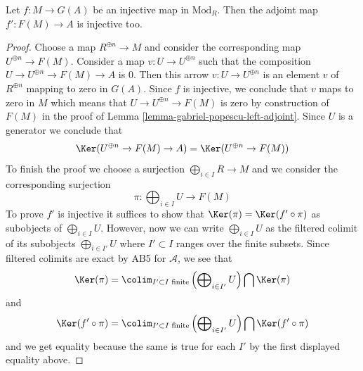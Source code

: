 \begin{lemma}
\label{lemma-F-G-monos}
Let $f : M \to G(A)$ be an injective map in $\text{Mod}_R$.
Then the adjoint map $f' : F(M) \to A$ is injective too.
\end{lemma}

\begin{proof}
Choose a map $R^{\oplus n} \to M$ and consider the corresponding map
$U^{\oplus n} \to F(M)$. Consider a map $v : U \to U^{\oplus n}$
such that the composition $U \to U^{\oplus n} \to F(M) \to A$ is $0$.
Then this arrow $v : U \to U^{\oplus n}$ is an element
$v$ of $R^{\oplus n}$ mapping to zero in $G(A)$. Since $f$ is injective,
we conclude that $v$ maps to zero in $M$ which means that
$U \to U^{\oplus n} \to F(M)$ is zero by construction of $F(M)$
in the proof of Lemma \ref{lemma-gabriel-popescu-left-adjoint}.
Since $U$ is a generator we conclude that
$$
\Ker(U^{\oplus n} \to F(M) \to A) = \Ker(U^{\oplus n} \to F(M))
$$
To finish the proof we choose a surjection $\bigoplus_{i \in I} R \to M$
and we consider the corresponding surjection
$$
\pi : \bigoplus\nolimits_{i \in I} U \longrightarrow F(M)
$$
To prove $f'$ is injective it suffices to show that
$\Ker(\pi) = \Ker(f' \circ \pi)$ as subobjects of $\bigoplus_{i \in I} U$.
However, now we can write $\bigoplus_{i \in I} U$ as the filtered colimit
of its subobjects $\bigoplus_{i \in I'} U$ where $I' \subset I$
ranges over the finite subsets. Since filtered colimits are
exact by AB5 for $\mathcal{A}$, we see that
$$
\Ker(\pi) =
\colim_{I' \subset I\text{ finite}}
\left(\bigoplus\nolimits_{i \in I'} U\right)
\bigcap \Ker(\pi)
$$
and
$$
\Ker(f' \circ \pi) =
\colim_{I' \subset I\text{ finite}}
\left(\bigoplus\nolimits_{i \in I'} U\right)
\bigcap \Ker(f' \circ \pi)
$$
and we get equality because the same is true for each $I'$ by
the first displayed equality above.
\end{proof}
